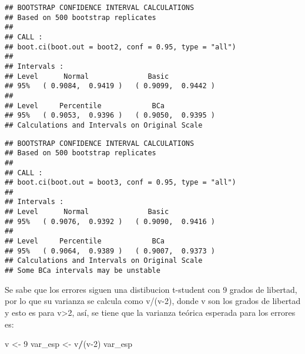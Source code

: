\documentclass[
]{article}
\newenvironment{Shaded}{\begin{snugshade}}{\end{snugshade}}
\newcommand{\CommentTok}[1]{\textcolor[rgb]{0.56,0.35,0.01}{\textit{#1}}}
\newcommand{\ControlFlowTok}[1]{\textcolor[rgb]{0.13,0.29,0.53}{\textbf{#1}}}
\newcommand{\DataTypeTok}[1]{\textcolor[rgb]{0.13,0.29,0.53}{#1}}
\newcommand{\DecValTok}[1]{\textcolor[rgb]{0.00,0.00,0.81}{#1}}
\newcommand{\FloatTok}[1]{\textcolor[rgb]{0.00,0.00,0.81}{#1}}
\newcommand{\KeywordTok}[1]{\textcolor[rgb]{0.13,0.29,0.53}{\textbf{#1}}}
\newcommand{\NormalTok}[1]{#1}
\newcommand{\OperatorTok}[1]{\textcolor[rgb]{0.81,0.36,0.00}{\textbf{#1}}}
\newcommand{\StringTok}[1]{\textcolor[rgb]{0.31,0.60,0.02}{#1}}
\begin{document}
\begin{verbatim}
## BOOTSTRAP CONFIDENCE INTERVAL CALCULATIONS
## Based on 500 bootstrap replicates
## 
## CALL : 
## boot.ci(boot.out = boot2, conf = 0.95, type = "all")
## 
## Intervals : 
## Level      Normal              Basic         
## 95%   ( 0.9084,  0.9419 )   ( 0.9099,  0.9442 )  
## 
## Level     Percentile            BCa          
## 95%   ( 0.9053,  0.9396 )   ( 0.9050,  0.9395 )  
## Calculations and Intervals on Original Scale
\end{verbatim}

\begin{Shaded}
\end{Shaded}

\begin{verbatim}
## BOOTSTRAP CONFIDENCE INTERVAL CALCULATIONS
## Based on 500 bootstrap replicates
## 
## CALL : 
## boot.ci(boot.out = boot3, conf = 0.95, type = "all")
## 
## Intervals : 
## Level      Normal              Basic         
## 95%   ( 0.9076,  0.9392 )   ( 0.9090,  0.9416 )  
## 
## Level     Percentile            BCa          
## 95%   ( 0.9064,  0.9389 )   ( 0.9007,  0.9373 )  
## Calculations and Intervals on Original Scale
## Some BCa intervals may be unstable
\end{verbatim}

Se sabe que los errores siguen una distibucion t-student con 9 grados de
libertad, por lo que su varianza se calcula como v/(v-2), donde v son
los grados de libertad y esto es para v\textgreater2, así, se tiene que
la varianza teórica esperada para los errores es:

\begin{Shaded}
\begin{Highlighting}[]
\NormalTok{v <-}\StringTok{ }\DecValTok{9}   
\NormalTok{var_esp <-}\StringTok{ }\NormalTok{v}\OperatorTok{/}\NormalTok{(v}\DecValTok{-2}\NormalTok{)   }
\NormalTok{var_esp}
\end{Highlighting}
\end{Shaded}
\end{document}

